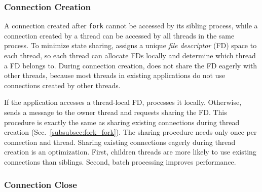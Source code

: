 
\subsubsection{Connection Creation}
\label{subsubsec:fork_new}

A connection created after \texttt{fork} cannot be accessed by its sibling process, while a connection created by a thread can be accessed by all threads in the same process. To minimize state sharing, \libipc assigns a unique \textit{file descriptor} (FD) space to each thread, so each thread can allocate FDs locally and determine which thread a FD belongs to. During connection creation, \libipc does not share the FD eagerly with other threads, because most threads in existing applications do not use connections created by other threads.

If the application accesses a thread-local FD, \libipc processes it locally. Otherwise, \libipc sends a message to the owner thread and requests sharing the FD. This procedure is exactly the same as sharing existing connections during thread creation (Sec.~\ref{subsubsec:fork_fork}). The sharing procedure needs only once per connection and thread. Sharing existing connections eagerly during thread creation is an optimization. First, children threads are more likely to use existing connections than siblings. Second, batch processing improves performance.

\subsubsection{Connection Close}
\label{subsubsec:fork_close}


